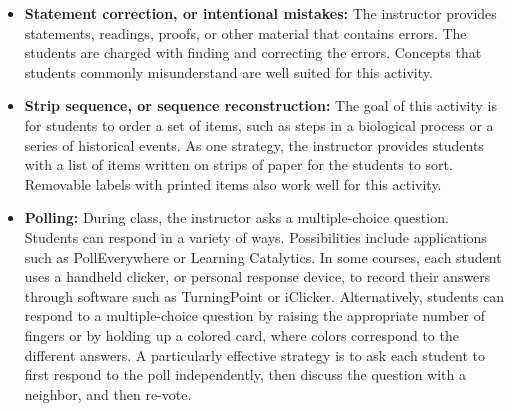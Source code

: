 \begin{itemize}
\item \textbf{Statement correction, or intentional mistakes:}  The instructor provides statements, readings, proofs, or other material that contains errors.  The students are charged with finding and correcting the errors.  Concepts that students commonly misunderstand are well suited for this activity.
  
\item \textbf{Strip sequence, or sequence reconstruction:} The goal of this activity is for students to order a set of items, such as steps in a biological process or a series of historical events.  As one strategy, the instructor provides students with a list of items written on strips of paper for the students to sort.  Removable labels with printed items also work well for this activity.

  
\item \textbf{Polling:}  During class, the instructor asks a multiple-choice question.  Students can respond in a variety of ways.  Possibilities include applications such as PollEverywhere or Learning Catalytics.  In some courses, each student uses a handheld clicker, or personal response device, to record their answers through software such as TurningPoint or iClicker.  Alternatively, students can respond to a multiple-choice question by raising the appropriate number of fingers or by holding up a colored card, where colors correspond to the different answers. A particularly effective strategy is to ask each student to first respond to the poll independently, then discuss the question with a neighbor, and then re-vote.

\end{itemize}

